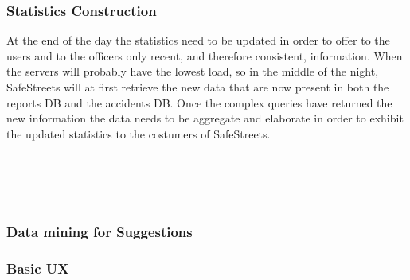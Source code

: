 \subsubsection{Statistics Construction}
At the end of the day the statistics need to be updated in order to offer to the users and to the officers only recent, and therefore consistent, information.
When the servers will probably have the lowest load, so in the middle of the night, SafeStreets will at first retrieve the new data that are now present in both the reports DB and the accidents DB. Once the complex queries have returned the new information the data needs to be aggregate and elaborate in order to exhibit the updated statistics to the costumers of SafeStreets. 
\\
\\
\\
\\
\\
\clearpage
\subsubsection{Data mining for Suggestions}
\clearpage
\subsubsection{Basic UX}
\clearpage